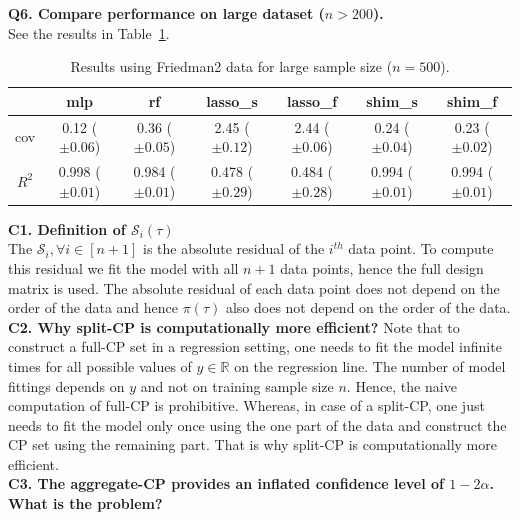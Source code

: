 \documentclass{article}
\begin{document}
\textbf{Q6. Compare performance on large dataset ($n>200$).}
\\

See the results in Table~\ref{tab:friedman2_large_n}.

\begin{table}[h!]
    \centering
    \begin{tabular}{|c|c|c|c|c|c|c|}
    \hline
         &mlp &rf &lasso\_s &lasso\_f &shim\_s &shim\_f \\
         \hline
         cov &0.12 ($\pm 0.06$)& 0.36 ($\pm 0.05$) &2.45 ($\pm 0.12$) &2.44 ($\pm 0.06$)  &0.24 ($\pm 0.04$)& 0.23 ($\pm 0.02$)\\
         \hline
          $R^2$ &0.998 ($\pm 0.01$)& 0.984 ($\pm 0.01$) &0.478 ($\pm 0.29$) &0.484 ($\pm 0.28$)  &0.994 ($\pm 0.01$)& 0.994 ($\pm 0.01$)\\
         \hline
    \end{tabular}
    \caption{Results using Friedman2 data for large sample size ($n=500$).}
    \label{tab:friedman2_large_n}
\end{table}

\textbf{C1. Definition of $\mathcal{S}_i(\tau)$}\\

The $\mathcal{S}_i, \forall i \in [n+1]$ is the absolute residual of the $i^{th}$ data point. To compute this residual we fit the model with all $n+1$ data points, hence the full design matrix is used. The absolute residual of each data point does not depend on the order of the data and hence $\pi(\tau)$ also does not depend on the order of the data. \\


\textbf{C2. Why split-CP is computationally more efficient?}
Note that to construct a full-CP set in a regression setting, one needs to fit the model infinite times for all possible values of $y \in \mathbb{R}$ on the regression line. The number of model fittings depends on $y$ and not on training sample size $n$. Hence, the naive computation of full-CP is prohibitive. Whereas, in case of a split-CP, one just needs to fit the model only once using the one part of the data and construct the CP set using the remaining part. That is why split-CP is computationally more efficient. \\   

\textbf{C3. The aggregate-CP provides an inflated confidence level of $1 - 2\alpha$. What is the problem?}\\
\end{document}
